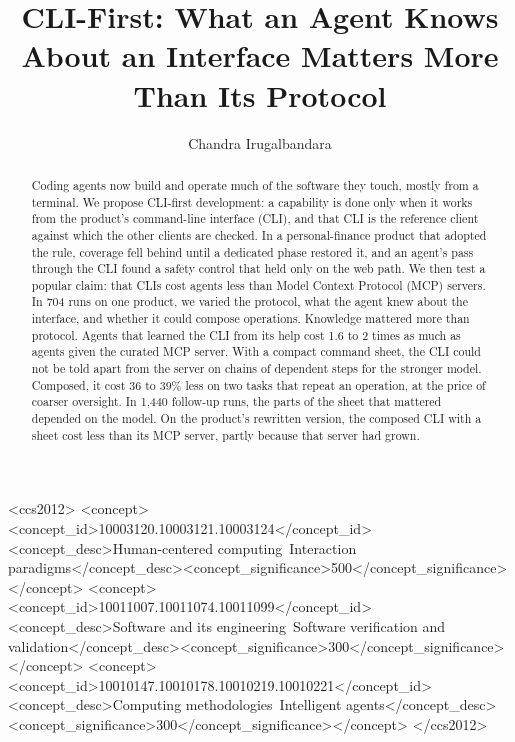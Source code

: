 \documentclass[sigconf,nonacm]{acmart}
\begin{document}
\title{CLI-First: What an Agent Knows About an Interface Matters More Than Its Protocol}

\author{Chandra Irugalbandara}

\begin{abstract}
Coding agents now build and operate much of the software they touch, mostly from a terminal. We propose CLI-first development: a capability is done only when it works from the product's command-line interface (CLI), and that CLI is the reference client against which the other clients are checked. In a personal-finance product that adopted the rule, coverage fell behind until a dedicated phase restored it, and an agent's pass through the CLI found a safety control that held only on the web path. We then test a popular claim: that CLIs cost agents less than Model Context Protocol (MCP) servers. In 704 runs on one product, we varied the protocol, what the agent knew about the interface, and whether it could compose operations. Knowledge mattered more than protocol. Agents that learned the CLI from its help cost 1.6 to 2 times as much as agents given the curated MCP server. With a compact command sheet, the CLI could not be told apart from the server on chains of dependent steps for the stronger model. Composed, it cost 36 to 39\% less on two tasks that repeat an operation, at the price of coarser oversight. In 1{,}440 follow-up runs, the parts of the sheet that mattered depended on the model. On the product's rewritten version, the composed CLI with a sheet cost less than its MCP server, partly because that server had grown.
\end{abstract}

\begin{CCSXML}
<ccs2012>
<concept><concept_id>10003120.10003121.10003124</concept_id><concept_desc>Human-centered computing~Interaction paradigms</concept_desc><concept_significance>500</concept_significance></concept>
<concept><concept_id>10011007.10011074.10011099</concept_id><concept_desc>Software and its engineering~Software verification and validation</concept_desc><concept_significance>300</concept_significance></concept>
<concept><concept_id>10010147.10010178.10010219.10010221</concept_id><concept_desc>Computing methodologies~Intelligent agents</concept_desc><concept_significance>300</concept_significance></concept>
</ccs2012>
\end{CCSXML}
\end{document}
